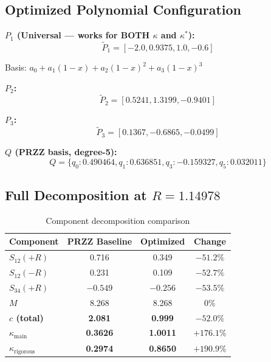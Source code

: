 \documentclass[11pt]{article}
\begin{document}
\subsection{Optimized Polynomial Configuration}

\textbf{$P_1$ (Universal --- works for BOTH $\kappa$ and $\kappa^*$):}
\begin{equation}
\boxed{\tilde{P}_1 = [-2.0, 0.9375, 1.0, -0.6]}
\end{equation}

Basis: $a_0 + a_1(1-x) + a_2(1-x)^2 + a_3(1-x)^3$

\textbf{$P_2$:}
\begin{equation}
\tilde{P}_2 = [0.5241, 1.3199, -0.9401]
\end{equation}

\textbf{$P_3$:}
\begin{equation}
\tilde{P}_3 = [0.1367, -0.6865, -0.0499]
\end{equation}

\textbf{$Q$ (PRZZ basis, degree-5):}
\begin{equation}
Q = \{q_0: 0.490464, q_1: 0.636851, q_3: -0.159327, q_5: 0.032011\}
\end{equation}

\subsection{Full Decomposition at $R = 1.14978$}

\begin{table}[h]
\centering
\caption{Component decomposition comparison}
\begin{tabular}{lccc}
\toprule
Component & PRZZ Baseline & Optimized & Change \\
\midrule
$S_{12}(+R)$ & 0.716 & 0.349 & $-51.2\%$ \\
$S_{12}(-R)$ & 0.231 & 0.109 & $-52.7\%$ \\
$S_{34}(+R)$ & $-0.549$ & $-0.256$ & $-53.5\%$ \\
$M$ & 8.268 & 8.268 & $0\%$ \\
\midrule
\textbf{$c$ (total)} & \textbf{2.081} & \textbf{0.999} & \textbf{$-52.0\%$} \\
\textbf{$\kappa_{\text{main}}$} & \textbf{0.3626} & \textbf{1.0011} & \textbf{$+176.1\%$} \\
\textbf{$\kappa_{\text{rigorous}}$} & \textbf{0.2974} & \textbf{0.8650} & \textbf{$+190.9\%$} \\
\bottomrule
\end{tabular}
\end{table}
\end{document}
